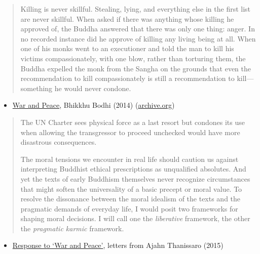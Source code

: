 \begin{quote}
Killing is never skillful. Stealing, lying, and everything else in the
first list are never skillful. When asked if there was anything whose
killing he approved of, the Buddha answered that there was only one
thing: anger. In no recorded instance did he approve of killing any
living being at all. When one of his monks went to an executioner and
told the man to kill his victims compassionately, with one blow, rather
than torturing them, the Buddha expelled the monk from the Sangha on the
grounds that even the recommendation to kill compassionately is still a
recommendation to kill---something he would never condone.
\end{quote}

\begin{itemize}
\tightlist
\item
  \href{https://www.inquiringmind.com/article/3002_5_bhodi-war-and-peace-a-buddhist-perspective/}{War
  and Peace}, Bhikkhu Bodhi (2014)
  (\href{https://web.archive.org/web/20151122005139/http://www.inquiringmind.com/Articles/WarAndPeace.html}{archive.org})
\end{itemize}

\begin{quote}
The UN Charter sees physical force as a last resort but condones its use
when allowing the transgressor to proceed unchecked would have more
disastrous consequences.

The moral tensions we encounter in real life should caution us against
interpreting Buddhist ethical prescriptions as unqualified absolutes.
And yet the texts of early Buddhism themselves never recognize
circumstances that might soften the universality of a basic precept or
moral value. To resolve the dissonance between the moral idealism of the
texts and the pragmatic demands of everyday life, I would posit two
frameworks for shaping moral decisions. I will call one the
\emph{liberative} framework, the other the \emph{pragmatic karmic}
framework.
\end{quote}

\begin{itemize}
\tightlist
\item
  \href{https://web.archive.org/web/20151123015056/http://www.inquiringmind.com/Articles/BhikkhuLetters.html}{Response
  to `War and Peace'}, letters from Ajahn Thanissaro (2015)
\end{itemize}

